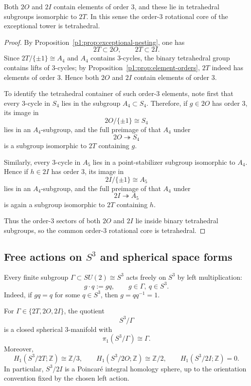 \documentclass[11pt]{article}
\begin{document}
\begin{corollary}
\label{p1:cor:common-order3-core}
Both \(2O\) and \(2I\) contain elements of order \(3\), and these lie in tetrahedral
subgroups isomorphic to \(2T\). In this sense the order-\(3\) rotational core of the
exceptional tower is tetrahedral.
\end{corollary}

\begin{proof}
By Proposition~\ref{p1:prop:exceptional-nesting}, one has
\[
2T\subset 2O,\qquad 2T\subset 2I.
\]
Since \(2T/\{\pm1\}\cong A_4\) and \(A_4\) contains \(3\)-cycles, the binary tetrahedral
group contains lifts of \(3\)-cycles; by Proposition~\ref{p1:prop:element-orders},
\(2T\) indeed has elements of order \(3\). Hence both \(2O\) and \(2I\) contain
elements of order \(3\).

To identify the tetrahedral container of such order-\(3\) elements, note first that every
\(3\)-cycle in \(S_4\) lies in the subgroup \(A_4\subset S_4\). Therefore, if
\(g\in 2O\) has order \(3\), its image in
\[
2O/\{\pm1\}\cong S_4
\]
lies in an \(A_4\)-subgroup, and the full preimage of that \(A_4\) under
\[
2O \twoheadrightarrow S_4
\]
is a subgroup isomorphic to \(2T\) containing \(g\).

Similarly, every \(3\)-cycle in \(A_5\) lies in a point-stabilizer subgroup isomorphic
to \(A_4\). Hence if \(h\in 2I\) has order \(3\), its image in
\[
2I/\{\pm1\}\cong A_5
\]
lies in an \(A_4\)-subgroup, and the full preimage of that \(A_4\) under
\[
2I \twoheadrightarrow A_5
\]
is again a subgroup isomorphic to \(2T\) containing \(h\).

Thus the order-\(3\) sectors of both \(2O\) and \(2I\) lie inside binary tetrahedral
subgroups, so the common order-\(3\) rotational core is tetrahedral.
\end{proof}

\subsection{Free actions on \texorpdfstring{\(S^3\)}{S3} and spherical space forms}
\label{p1:sec:space-forms}

Every finite subgroup \(\Gamma\subset SU(2)\cong S^3\) acts freely on \(S^3\) by left
multiplication:
\[
g\cdot q := gq,\qquad g\in \Gamma,\ q\in S^3.
\]
Indeed, if \(gq=q\) for some \(q\in S^3\), then \(g=qq^{-1}=1\).

\begin{proposition}
\label{p1:prop:exceptional-space-forms}
For \(\Gamma\in\{2T,2O,2I\}\), the quotient
\[
S^3/\Gamma
\]
is a closed spherical \(3\)-manifold with
\[
\pi_1(S^3/\Gamma)\cong \Gamma.
\]
Moreover,
\[
H_1(S^3/2T;\mathbb Z)\cong \mathbb Z/3,\qquad
H_1(S^3/2O;\mathbb Z)\cong \mathbb Z/2,\qquad
H_1(S^3/2I;\mathbb Z)=0.
\]
In particular, \(S^3/2I\) is a Poincar\'e integral homology sphere, up to the orientation convention fixed by the chosen left action.
\end{proposition}
\end{document}
